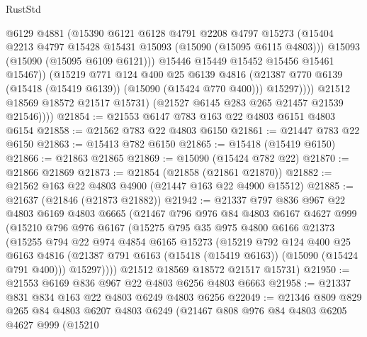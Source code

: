 \begin{lexlean}{RustStd}
\begin{coremodule}
                      @6129
                      @4881
                      (@15390
                        @6121
                        @6128
                        @4791
                        @2208
                        @4797
                        @15273
                        (@15404 @2213 @4797 @15428 @15431 @15093 (@15090 (@15095 @6115 @4803)))
                        @15093
                        (@15090 (@15095 @6109 @6121)))
                      @15446
                      @15449
                      @15452
                      @15456
                      @15461
                      @15467))
                  (@15219
                    @771
                    @124
                    @400
                    @25
                    @6139
                    @4816
                    (@21387 @770 @6139 (@15418 (@15419 @6139)) (@15090 (@15424 @770 @400)))
                    @15297))))
            @21512
            @18569
            @18572
            @21517
            @15731)
          (@21527 @6145 @283 @265 @21457 @21539 @21546))))
@21854 := @21553 @6147 @783 @163 @22 @4803 @6151 @4803 @6154
@21858 := @21562 @783 @22 @4803 @6150
@21861 := @21447 @783 @22 @6150
@21863 := @15413 @782 @6150
@21865 := @15418 (@15419 @6150)
@21866 := @21863 @21865
@21869 := @15090 (@15424 @782 @22)
@21870 := @21866 @21869
@21873 := @21854 (@21858 (@21861 @21870))
@21882 := @21562 @163 @22 @4803 @4900 (@21447 @163 @22 @4900 @15512)
@21885 := @21637 (@21846 (@21873 @21882))
@21942 := @21337
    @797
    @836
    @967
    @22
    @4803
    @6169
    @4803
    @6665
    (@21467
      @796
      @976
      @84
      @4803
      @6167
      @4627
      @999
      (@15210
        @796
        @976
        @6167
        (@15275
          @795
          @35
          @975
          @4800
          @6166
          @21373
          (@15255
            @794
            @22
            @974
            @4854
            @6165
            @15273
            (@15219
              @792
              @124
              @400
              @25
              @6163
              @4816
              (@21387 @791 @6163 (@15418 (@15419 @6163)) (@15090 (@15424 @791 @400)))
              @15297))))
      @21512
      @18569
      @18572
      @21517
      @15731)
@21950 := @21553 @6169 @836 @967 @22 @4803 @6256 @4803 @6663
@21958 := @21337 @831 @834 @163 @22 @4803 @6249 @4803 @6256
@22049 := @21346
    @809
    @829
    @265
    @84
    @4803
    @6207
    @4803
    @6249
    (@21467
      @808
      @976
      @84
      @4803
      @6205
      @4627
      @999
      (@15210

\end{coremodule}
\end{lexlean}
